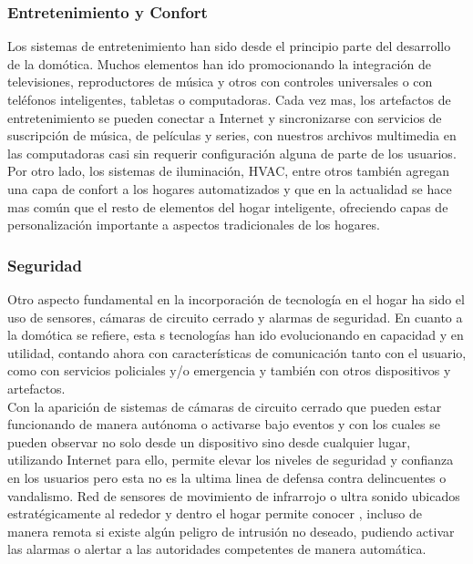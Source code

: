 \subsubsection{Entretenimiento y Confort}
Los sistemas de entretenimiento han sido desde el principio parte del desarrollo de la domótica. Muchos elementos han ido promocionando la integración de televisiones, reproductores de música y otros con controles universales o con teléfonos inteligentes, tabletas o computadoras. Cada vez mas, los artefactos de entretenimiento se pueden conectar a Internet y sincronizarse con servicios de suscripción de música, de películas y series, con nuestros archivos multimedia en las computadoras casi sin requerir configuración alguna de parte de los usuarios. \\

Por otro lado, los sistemas de iluminación, HVAC, entre otros también agregan una capa de confort a los hogares automatizados y que en la actualidad se hace mas común que el resto de elementos del hogar inteligente, ofreciendo capas de personalización importante a aspectos tradicionales de los hogares.

\subsubsection{Seguridad}
Otro aspecto fundamental en la incorporación de tecnología en el hogar ha sido el uso de sensores, cámaras de circuito cerrado y alarmas de seguridad. En cuanto a la domótica se refiere, esta s tecnologías han ido evolucionando en capacidad y en utilidad, contando ahora con características de comunicación tanto con el usuario, como con servicios policiales  y/o emergencia y también con otros dispositivos y artefactos. \\

Con la aparición de sistemas de cámaras de circuito cerrado que pueden estar funcionando de manera autónoma o  activarse bajo eventos y con los cuales se pueden observar no solo desde un dispositivo sino desde cualquier lugar, utilizando Internet para ello, permite elevar los niveles de seguridad y confianza en los usuarios pero esta no es la ultima linea de defensa contra delincuentes o vandalismo. Red de sensores de movimiento de infrarrojo o ultra sonido ubicados estratégicamente al rededor y dentro el hogar permite conocer , incluso de manera remota si existe algún peligro de intrusión no deseado, pudiendo activar las alarmas o alertar a las autoridades competentes de manera automática.\\

